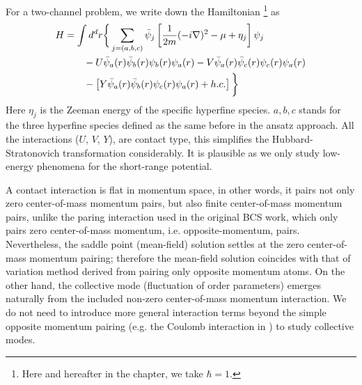 For a two-channel problem, we write down the Hamiltonian \footnote{Here and hereafter in the chapter, we take $\hbar=1$.} as
\begin{equation}\label{eq:pathInt2:ham2}
\begin{split}
H&=\int{d^{d}r}\bigg\{\sum_{j=(a,b,c)}\bar\psi_{j}\left[\frac{1}{2m}(-i\nabla)^{2}-\mu+\eta_{j}\right]\psi_{j}\\
	&\qquad-U\bar\psi_{a}(r)\bar\psi_{b}(r)\psi_{b}(r)\psi_{a}(r)-V\bar\psi_{a}(r)\bar\psi_{c}(r)\psi_{c}(r)\psi_{a}(r)\\
	&\qquad-\left[Y\bar\psi_{a}(r)\bar\psi_{b}(r)\psi_{c}(r)\psi_{a}(r)+h.c.\right]
	\bigg\}
\end{split}
\end{equation}
Here $\eta_{j}$ is the Zeeman energy of the specific hyperfine species.  $a,b,c$ stands for the three hyperfine species defined as the same before in the ansatz approach.  All the interactions ($U$, $V$, $Y$), are contact type, this simplifies the Hubbard-Stratonovich transformation considerably.  It is plausible as we only study low-energy phenomena for the short-range potential. 

A contact interaction is  flat in momentum space, in other words, it pairs not only zero center-of-mass momentum pairs, but also finite center-of-mass momentum pairs, unlike the paring interaction used in the original BCS work\cite{BCS}, which only pairs zero center-of-mass momentum, i.e. opposite-momentum, pairs.  Nevertheless, the saddle point (mean-field) solution settles at the zero center-of-mass momentum pairing; therefore the mean-field solution coincides with that of  variation method derived from pairing  only opposite momentum atoms.  On the other hand, the collective mode (fluctuation of order parameters) emerges naturally from the included non-zero center-of-mass momentum interaction.  We do not need to introduce more general interaction terms beyond the simple opposite momentum pairing (e.g. the Coulomb interaction in \cite{AndersonBCS}) to study collective modes.   

